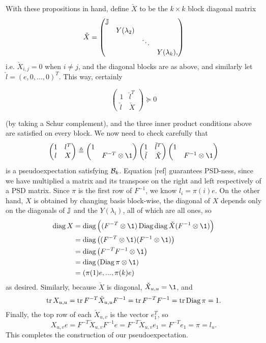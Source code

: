 \noindent With these propositions in hand, define $\check X$ to be the $k\times k$ block diagonal matrix
$$
    \check X = \begin{pmatrix} 
        \mathbb{J} & & & \\
           &Y(\lambda_2)& & \\
           & &\ddots & \\
           & & & Y(\lambda_k),
    \end{pmatrix}
$$
i.e. $\check X_{i,j} = 0$ when $i\neq j$, and the diagonal blocks are as above, and similarly let $\check l = (e,0,...,0)^T$. This way, certainly 

\begin{equation}
    \begin{pmatrix} 1 & \check l^T \\ \check l & \check X \end{pmatrix} \succeq 0  
\end{equation}
 
\noindent (by taking a Schur complement), and the three inner product conditions above are satisfied on every block. We now need to check carefully that 
$$
    \begin{pmatrix} 1 & l^T \\ l & X \end{pmatrix}
    \triangleq \begin{pmatrix} 1 & \\ & F^{-T}\otimes \1 \end{pmatrix} \begin{pmatrix} 1 & \check l^T \\ \check l & \check X \end{pmatrix} \begin{pmatrix} 1 & \\ & F^{-1}\otimes \1 \end{pmatrix}
$$
is a pseudoexpectation satisfying $\mathcal{B}_k$. Equation [ref] guarantees PSD-ness, since we have multiplied a matrix and its transpose on the right and left respectively of a PSD matrix. Since $\pi$ is the first row of $F^{-1}$, we know $l_i = \pi(i)e$. On the other hand, $X$ is obtained by changing basis block-wise, the diagonal of $X$ depends only on the diagonals of $\mathbb{J}$ and the $Y(\lambda_i)$, all of which are all ones, so
\begin{align*}
    \diag X 
    &= \diag\left((F^{-T}\otimes \1)\Diag\diag \check X (F^{-1}\otimes \1)\right) \\
    &=\diag\left((F^{-T}\otimes \1) (F^{-1}\otimes \1)\right) \\
    &= \diag\left(F^{-T}F^{-1} \otimes \1\right) \\
    &= \diag\left(\Diag\pi \otimes \1\right) \\
    &= (\pi(1)e,...,\pi(k)e)
\end{align*}
as desired. Similarly, because $\check X$ is diagonal, $\check X_{u,u} = \1$, and
$$
    \operatorname{tr} X_{u,u} = \operatorname{tr} F^{-T}\check X_{u,u} F^{-1} = \operatorname{tr} F^{-T}F^{-1} = \operatorname{tr} \operatorname{Diag} \pi = 1.
$$
Finally, the top row of each $\check X_{u,v}$ is the vector $e_1^T$, so
$$
    X_{u,v}e = F^{-T}\check X_{u,v}F^{-1}e = F^{-T}\check X_{u,v}e_1 = F^{-T}e_1 = \pi = l_u.
$$
This completes the construction of our pseudoexpectation.

